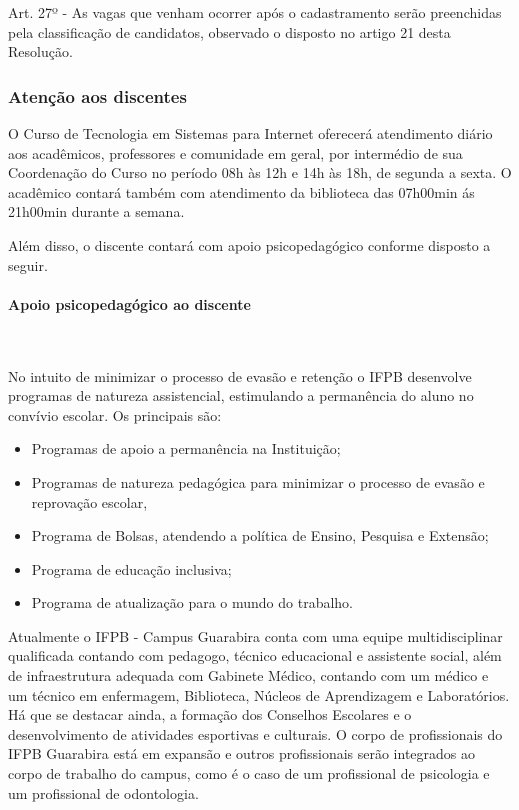 Art. 27º - As vagas que venham ocorrer após o cadastramento serão preenchidas pela classificação de candidatos, observado o disposto no artigo 21 desta Resolução.


\subsubsection{Aten\c{c}\~ao aos discentes}

O Curso de Tecnologia em Sistemas para Internet oferecerá atendimento diário aos acadêmicos, professores e comunidade em geral, por intermédio de sua Coordenação do Curso no período 08h às 12h e 14h às 18h, de segunda a sexta. O acadêmico contará também com atendimento da biblioteca das 07h00min ás 21h00min durante a semana.

Além disso, o discente contará com apoio psicopedagógico conforme disposto a seguir.

\paragraph{Apoio psicopedagógico ao discente}\

       No intuito de minimizar o processo de evasão e retenção o IFPB desenvolve programas de natureza assistencial, estimulando a permanência do aluno no convívio escolar. Os principais são: 


\begin{itemize}
\item Programas de apoio a permanência na Instituição;

\item Programas de natureza pedagógica para minimizar o processo de evasão e reprovação escolar, 

\item Programa de Bolsas, atendendo a política de Ensino, Pesquisa e  Extensão;

\item Programa de educação inclusiva;

\item Programa de atualização para o mundo do trabalho.
\end{itemize}


      Atualmente o IFPB - Campus Guarabira conta com uma equipe multidisciplinar qualificada contando com pedagogo, técnico educacional e assistente social, além de infraestrutura adequada com Gabinete Médico, contando com um m\'edico e um t\'ecnico em enfermagem, Biblioteca, Núcleos de Aprendizagem e Laboratórios. Há que se destacar ainda, a formação dos Conselhos Escolares e o desenvolvimento de atividades esportivas e culturais. O corpo de profissionais do IFPB Guarabira est\'a em expans\~ao e outros profissionais ser\~ao integrados ao corpo de trabalho do campus, como \'e o caso de um profissional de psicologia e um profissional de odontologia.

